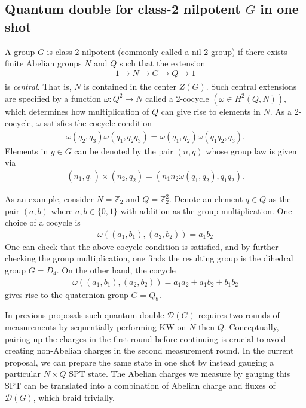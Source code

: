 \documentclass[nofootinbib,prx,twocolumn,showpacs,superscriptaddress,notitlepage,amsmath,amssymb]{revtex4-2}
\theoremstyle{definition}
\def\ZZ{\mathbb Z}
\begin{document}
\subsection{Quantum double for class-2 nilpotent $G$ in one shot}\label{sec:nil2}
A group $G$ is class-2 nilpotent (commonly called a nil-2 group) if there exists finite Abelian groups $N$ and $Q$ such that the extension
\begin{equation}
 1 \rightarrow N  \xrightarrow[]{} G  \xrightarrow[]{} Q \rightarrow 1
 \label{eq:centralextension}
\end{equation}
is \textit{central}. That is, $N$ is contained in the center $Z(G)$. Such central extensions are specified by a function $\omega:Q^2\rightarrow N$ called a 2-cocycle $(\omega \in H^2(Q,N))$, which determines how multiplication of $Q$ can give rise to elements in $N$. As a 2-cocycle, $\omega$ satisfies the cocycle condition
\begin{align}
    \omega(q_2,q_3) \omega(q_1,q_2q_3)  = \omega(q_1,q_2) \omega(q_1q_2,q_3).
\end{align}
Elements in $g\in G$ can be denoted by the pair $(n,q)$ whose group law is given via
\begin{align}
    (n_1,q_1) \times (n_2,q_2) = (n_1n_2\omega(q_1,q_2),q_1q_2).
\end{align}

As an example, consider $N=\ZZ_2$ and $Q=\ZZ_2^2$. Denote an element $q\in Q$ as the pair $(a,b)$ where $a,b \in \{0,1\}$ with addition as the group multiplication. One choice of a cocycle is
\begin{align}
    \omega((a_1,b_1),(a_2,b_2)) = a_1b_2
\end{align}
One can check that the above cocycle condition is satisfied, and by further checking the group multiplication, one finds the resulting group is the dihedral group $G=D_4$. On the other hand, the cocycle
\begin{align}
    \omega((a_1,b_1),(a_2,b_2)) = a_1a_2 +a_1b_2 + b_1b_2
\end{align}
gives rise to the quaternion group $G=Q_8$.


In previous proposals \cite{measureSPT,Bravyi22} such quantum double $\mathcal D(G)$ requires two rounds of measurements by sequentially performing KW on $N$ then $Q$. Conceptually, pairing up the charges in the first round before continuing is crucial to avoid creating non-Abelian charges in the second measurement round.  In the current proposal, we can prepare the same state in one shot by instead gauging a particular $N\times Q$ SPT state. The Abelian charges we measure by gauging this SPT can be translated into a combination of Abelian charge and fluxes of $\mathcal D(G)$, which braid trivially.
\end{document}
